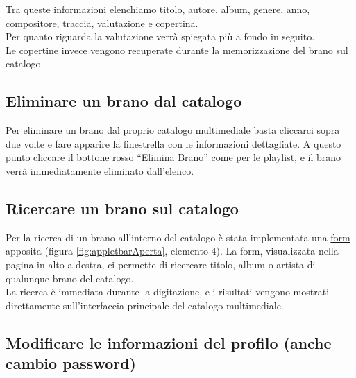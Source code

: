 Tra queste informazioni elenchiamo titolo, autore, album, genere, anno,
compositore, traccia, valutazione e copertina.\\
Per quanto riguarda la valutazione verr\`a spiegata pi\`u a fondo in seguito.\\
Le copertine invece vengono recuperate durante la memorizzazione del brano sul
catalogo.

\subsection{Eliminare un brano dal catalogo}

Per eliminare un brano dal proprio catalogo multimediale basta cliccarci sopra
due volte e fare apparire la finestrella con le informazioni dettagliate. A
questo punto cliccare il bottone rosso ``Elimina Brano'' come per le
playlist, e il brano verr\`a immediatamente eliminato dall'elenco.

\subsection{Ricercare un brano sul catalogo}
\label{cap:ricerca}
Per la ricerca di un brano all'interno del catalogo \`e stata implementata una
\underline{form} apposita (figura \ref{fig:appletbarAperta}, elemento 4). La
form, visualizzata nella pagina in alto a destra, ci permette di ricercare
titolo, album o artista di qualunque brano del catalogo.\\ 
La ricerca \`e immediata durante la digitazione, e i risultati vengono mostrati
direttamente sull'interfaccia principale del catalogo multimediale.

\subsection{Modificare le informazioni del profilo (anche cambio password)}

